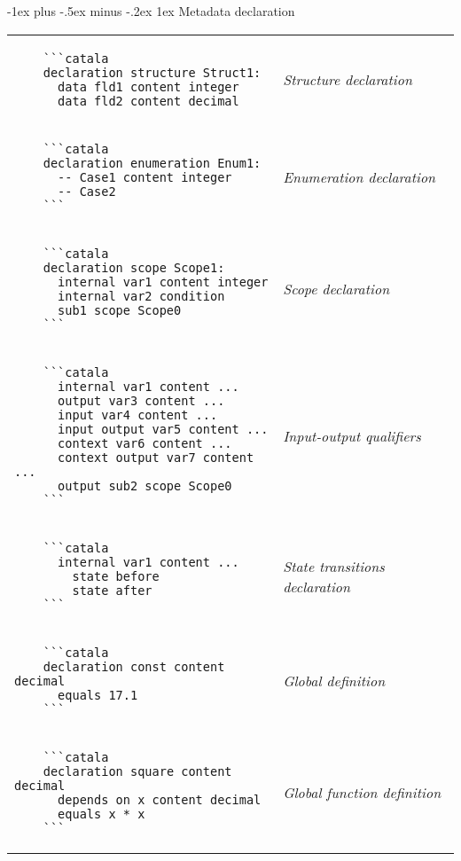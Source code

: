\documentclass{article}
\makeatletter
\newcommand\articlenormalsize{\fontsize{10pt}{12pt}\selectfont}
\renewcommand{\section}{\@startsection{section}{1}{0mm}%
                                {-1ex plus -.5ex minus -.2ex}%
                                {1ex}%
                                {\normalfont\articlenormalsize\bfseries}}
\newenvironment{catala}{%
  \VerbatimEnvironment
  \let\FV@ListVSpace\relax
  \begin{verbatim}}%
 {\end{verbatim}}
\makeatother
\begin{document}
\begin{multicols}{3}
\section{Metadata declaration}

\begin{tabular}{@{}p{\cola}>{\slshape}p{\colb}@{}}

  \begin{catala}
    ```catala
    declaration structure Struct1:
      data fld1 content integer
      data fld2 content decimal
  \end{catala}
  & Structure declaration
  \\
  \begin{catala}
    ```catala
    declaration enumeration Enum1:
      -- Case1 content integer
      -- Case2
    ```
  \end{catala}
  & Enumeration declaration
  \\
  \begin{catala}
    ```catala
    declaration scope Scope1:
      internal var1 content integer
      internal var2 condition
      sub1 scope Scope0
    ```
  \end{catala}
  & Scope declaration
  \\
  \begin{catala}
    ```catala
      internal var1 content ...
      output var3 content ...
      input var4 content ...
      input output var5 content ...
      context var6 content ...
      context output var7 content ...
      output sub2 scope Scope0
    ```
  \end{catala}
  & Input-output qualifiers
  \\
  \begin{catala}
    ```catala
      internal var1 content ...
        state before
        state after
    ```
  \end{catala}
  & State transitions declaration
  \\
  \begin{catala}
    ```catala
    declaration const content decimal
      equals 17.1
    ```
  \end{catala}
  & Global definition
  \\
  \begin{catala}
    ```catala
    declaration square content decimal
      depends on x content decimal
      equals x * x
    ```
  \end{catala}
  & Global function definition
  \\
\end{tabular}


\end{multicols}
\end{document}
